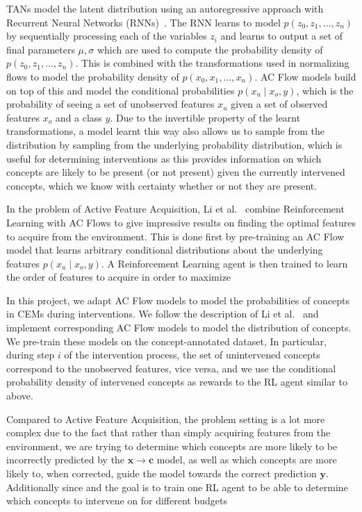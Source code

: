 \documentclass[../main.tex]{subfiles}
\begin{document}
TANs model the latent distribution using an autoregressive approach with Recurrent
Neural Networks (RNNs)~\cite{rnn}. The RNN learns to model
$p(z_0, z_1, \ldots, z_n)$ by sequentially processing each of the variables $z_i$ and learns
to output a set of final parameters $\mu, \sigma$ which are used to compute the probability density
of $p(z_0, z_1, \ldots, z_n)$. This is combined with the transformations used in normalizing flows to 
model the probability density of $p(x_0, x_1, \ldots, x_n)$. AC Flow models
build on top of this and model the conditional probabilities $p(x_u \mid x_o, y)$, which is the probability of 
seeing a set of unobserved features $x_u$
given a set of observed features $x_o$ and a class $y$. 
Due to the invertible property of the learnt transformations,
a model learnt this way also allows us to sample from the distribution
by sampling from the underlying probability distribution, which is useful for
determining interventions as
this provides information on which concepts are likely to be present (or not present) given the currently intervened
concepts, which we know with certainty whether or not they are present.

In the problem of Active Feature Acquisition, Li et al.~\cite{afa} combine Reinforcement Learning with 
AC Flows to give impressive results on finding the optimal features to acquire from the environment. This is done
first by pre-training an AC Flow model that learns arbitrary conditional distributions about the underlying
features $p(x_u \mid x_o, y)$. A Reinforcement Learning agent is then trained to learn 
the order of features to acquire in order to maximize 

In this project, we adapt AC Flow models to model the probabilities of concepts in CEMs during interventions.
We follow the description of Li et al.~\cite{afa} and implement corresponding AC Flow models to model
the distribution of concepts. We pre-train these models on the concept-annotated dataset,
In particular, during step $i$ of the intervention process, the set of unintervened concepts correspond 
to the unobserved features, vice versa, and we use the conditional probability density of 
intervened concepts as rewards to the RL agent similar to above.

Compared to Active Feature Acquisition, the problem setting is a lot more complex due to the fact that
rather than simply acquiring features from the environment, we are trying to determine
which concepts are more likely to be incorrectly predicted by the $\mathbf{x} \to \mathbf{c}$ model, as well as 
which concepts are more likely to, when corrected, guide the model towards the correct prediction $\mathbf{y}$.
Additionally since and the goal is to train one RL agent to be able to determine which concepts
to intervene on for different budgets
\end{document}
